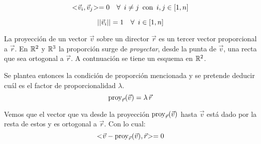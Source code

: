 \begin{mdframed}[style=DefinitionFrame]
    \begin{defn}
    \end{defn}
    \begin{equation*}
        <\hspace{-0.8mm}\Vec{v}_i,\Vec{v}_j\hspace{-0.8mm}> = 0 \quad \forall \enspace  i\neq j \enspace \textrm{con} \enspace i,j \in [1,n]
    \end{equation*}
\end{mdframed}

\begin{mdframed}[style=DefinitionFrame]
    \begin{defn}
    \end{defn}
    \begin{equation*}
        {\left|\left| {\Vec{v}_i} \right|\right|} = 1 \quad \forall \enspace  i \in [1,n]
    \end{equation*}
\end{mdframed}

La proyección de un vector $\Vec{v}$ sobre un director $\Vec{r}$ es un tercer vector proporcional a $\Vec{r}$.
En $\mathbb{R}^2$ y $\mathbb{R}^3$ la proporción surge de \emph{proyectar}, desde la punta de $\Vec{v}$, una recta que sea ortogonal a $\Vec{r}$.
A contnuación se tiene un esquema en $\mathbb{R}^2$.

\begin{center}
    \def\svgwidth{0.6\linewidth}
    
\end{center}

Se plantea entonces la condición de proporción mencionada y se pretende deducir cuál es el factor de proporcionalidad $\lambda$.
\begin{equation}
    \operatorname{proy}_{\Vec{r}}(\Vec{v}) = \lambda \, \Vec{r}
    \label{eqn:orto1}
\end{equation}

Vemos que el vector que va desde la proyección $\operatorname{proy}_{\Vec{r}}(\Vec{v})$ hasta $\Vec{v}$ está dado por la resta de estos y es ortogonal a $\Vec{r}$.
Con lo cual:
\begin{equation}
    <\hspace{-0.8mm}\Vec{v} - \operatorname{proy}_{\Vec{r}}(\Vec{v}),\Vec{r}\hspace{-0.8mm}> = 0
    \label{eqn:orto2}
\end{equation}

